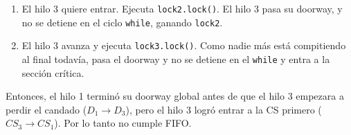 \begin{enumerate}
\begin{enumerate}
        \item El hilo 3 quiere entrar. Ejecuta \texttt{lock2.lock()}. El hilo 3 pasa su doorway, y no se detiene en el ciclo \texttt{while}, ganando \texttt{lock2}.
        \item El hilo 3 avanza y ejecuta \texttt{lock3.lock()}. Como nadie más está compitiendo al final todavía, pasa el doorway y no se detiene en el \texttt{while} y entra a la sección crítica.
    \end{enumerate}
    Entonces, el hilo 1 terminó su doorway global antes de que el hilo 3 empezara a perdir el candado ($D_1 \rightarrow D_3$), pero el hilo 3 logró entrar a la CS primero ($CS_3 \rightarrow CS_1$). Por lo tanto no cumple FIFO.
\end{enumerate}